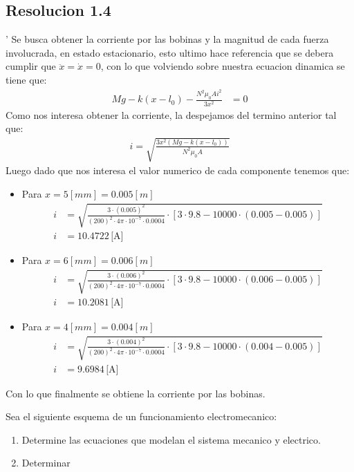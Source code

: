 \documentclass[
  11pt,
  letterpaper,
   addpoints,
   answers
  ]{exam}
\begin{document}
\begin{questions}
\begin{solution}
        \subsection*{Resolucion 1.4}'
        Se busca obtener la corriente por las bobinas y la magnitud de cada fuerza involucrada, en estado estacionario, esto ultimo hace referencia que se debera cumplir que $\ddot{x}= \dot{x}=0$, con lo que volviendo sobre nuestra ecuacion dinamica se tiene que:
        \begin{align}
            Mg - k(x-l_{0}) - \frac{N^{2}\mu_{0}Ai^{2}}{3x^{2}} &= 0 
        \end{align}
        Como nos interesa obtener la corriente, la despejamos del termino anterior tal que:
        \begin{align}
            i = \sqrt{\frac{3x^{2}(Mg - k(x-l_{0}))}{N^{2}\mu_{0}A}}
        \end{align}
        Luego dado que nos interesa el valor numerico de cada componente tenemos que:
        \begin{itemize}
            \item Para $x = 5[mm] = 0.005[m]$
            \begin{align}
                i &= \sqrt{\frac{3 \cdot (0.005)^2}{(200)^2 \cdot 4\pi \cdot 10^{-7} \cdot 0.0004} \cdot \left[3 \cdot 9.8 - 10000 \cdot \left(0.005 - 0.005\right)\right]} \\
                i &= 10.4722 \, \text{[A]}
            \end{align}
            \item Para $x = 6[mm] = 0.006[m]$
            \begin{align}
                i &= \sqrt{\frac{3 \cdot (0.006)^2}{(200)^2 \cdot 4\pi \cdot 10^{-7} \cdot 0.0004} \cdot \left[3 \cdot 9.8 - 10000 \cdot \left(0.006 - 0.005\right)\right]} \\
                i &= 10.2081 \, \text{[A]}
            \end{align}
            \item Para $x = 4[mm] = 0.004[m]$
            \begin{align}
                i &= \sqrt{\frac{3 \cdot (0.004)^2}{(200)^2 \cdot 4\pi \cdot 10^{-7} \cdot 0.0004} \cdot \left[3 \cdot 9.8 - 10000 \cdot \left(0.004 - 0.005\right)\right]} \\
                i &= 9.6984 \, \text{[A]}
            \end{align}
        \end{itemize}
        Con lo que finalmente se obtiene la corriente por las bobinas.
    \end{solution}
    \question Sea el siguiente esquema de un funcionamiento electromecanico:
    \begin{enumerate}
        \item Determine las ecuaciones que modelan el sistema mecanico y electrico.
        \item Determinar
    \end{enumerate}
\begin{solution}

\end{solution}
\end{questions}
\end{document}
